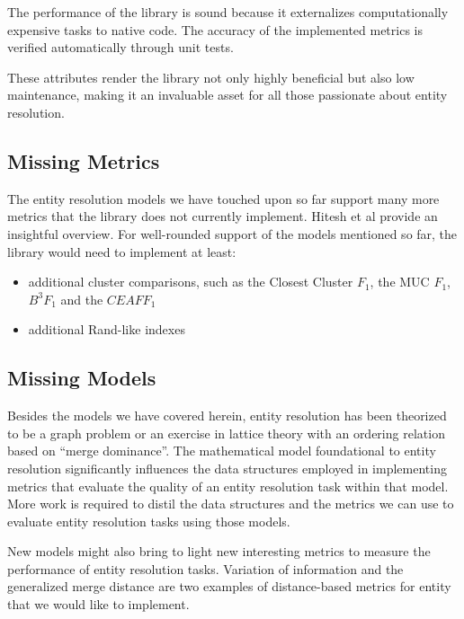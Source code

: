 \documentclass[a4paper,twoside]{article}
\begin{document}
    The performance of the library is sound because it externalizes
    computationally expensive tasks to native code.
    The accuracy of the implemented metrics is verified automatically through
    unit tests.

    These attributes render the library not only highly beneficial but also low
    maintenance, making it an invaluable asset for all those passionate about
    entity resolution.

    \subsection{Missing Metrics}

    The entity resolution models we have touched upon so far support many more
    metrics that the library does not currently implement.
    Hitesh et al provide an insightful overview\cite{hitesh2012}.
    For well-rounded support of the models mentioned so far, the library would
    need to implement at least:
    \begin{itemize}
        \item additional cluster comparisons, such as the Closest Cluster $F_1$, the
        MUC $F_1$, $B^3 F_1$ and the $CEAF F_1$\cite{hitesh2012}
        \item additional Rand-like indexes\cite{warrens2022understanding}
    \end{itemize}

    \subsection{Missing Models}

    Besides the models we have covered herein, entity resolution has been
    theorized to be a graph problem\cite{eager2021} or an exercise in lattice
    theory with an ordering relation based on
    ``merge dominance''\cite{Ben2009Swoosh}.
    The mathematical model foundational to entity resolution significantly
    influences the data structures employed in implementing metrics that
    evaluate the quality of an entity resolution task within that model.
    More work is required to distil the data structures and the metrics we can
    use to evaluate entity resolution tasks using those models.

    New models might also bring to light new interesting metrics to
    measure the performance of entity resolution tasks.
    Variation of information\cite{meila2007vi} and the generalized merge
    distance\cite{Men10} are two examples of distance-based metrics for entity
    that we would like to implement.

    
    {
        \small
        
    }
\end{document}
